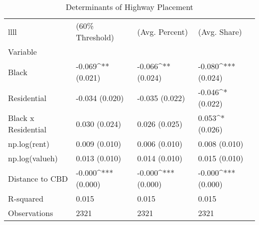 \begin{table}[h]
\centering
\caption{Determinants of Highway Placement}
\label{tab:initial_results}
\begin{tabularx}{\textwidth}{X|X|X|X}{llll}
\toprule
 & (60\% Threshold) & (Avg. Percent) & (Avg. Share) \\
Variable &  &  &  \\
\midrule
Black & -0.069^{**}
(0.021) & -0.066^{**}
(0.024) & -0.080^{***}
(0.024) \\
Residential & -0.034
(0.020) & -0.035
(0.022) & -0.046^{*}
(0.022) \\
Black x Residential & 0.030
(0.024) & 0.026
(0.025) & 0.053^{*}
(0.026) \\
np.log(rent) & 0.009
(0.010) & 0.006
(0.010) & 0.008
(0.010) \\
np.log(valueh) & 0.013
(0.010) & 0.014
(0.010) & 0.015
(0.010) \\
Distance to CBD & -0.000^{***}
(0.000) & -0.000^{***}
(0.000) & -0.000^{***}
(0.000) \\
R-squared & 0.015 & 0.015 & 0.015 \\
Observations & 2321 & 2321 & 2321 \\
\bottomrule
\end{tabularx}
\end{table}
